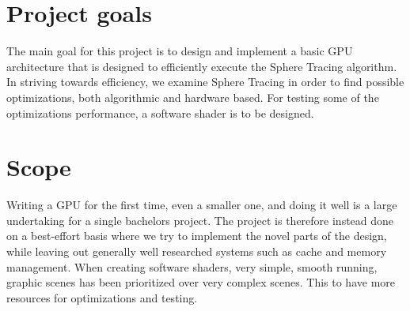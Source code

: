 	\section{Project goals}
	
		The main goal for this project is to design and implement a basic GPU
		architecture that is designed to efficiently execute the Sphere Tracing
		algorithm. In striving towards efficiency, we examine Sphere Tracing in
		order to find possible optimizations, both algorithmic and hardware based.
		For testing some of the optimizations performance, a software shader is to
		be designed.
		
	\section{Scope}

		Writing a GPU for the first time, even a smaller one, and doing it well is
		a large undertaking for a single bachelors project. The project is
		therefore instead done on a best-effort basis where we try to implement the
		novel parts of the design, while leaving out generally well researched
		systems such as cache and memory management. When creating software
		shaders, very simple, smooth running, graphic scenes has been prioritized
		over very complex scenes. This to have more resources for optimizations and
		testing.


